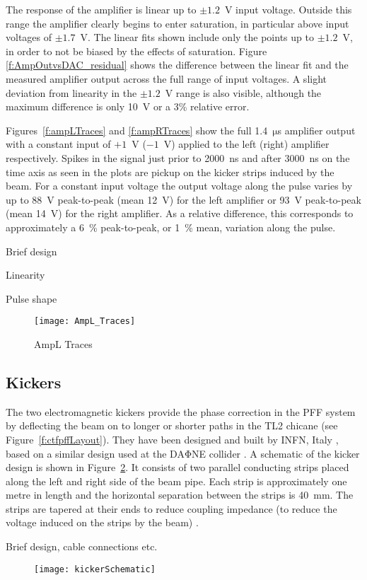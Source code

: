 The response of the amplifier is linear up to \(\pm1.2\)~V input voltage. 
Outside this range the amplifier clearly begins to enter saturation, in 
particular above input voltages of \(\pm1.7\)~V. The linear fits shown include 
only the points up to \(\pm1.2\)~V, in order to not be biased by the effects of 
saturation. Figure \ref{f:AmpOutvsDAC_residual} shows the difference between 
the linear fit and the measured amplifier output across the full range of input 
voltages. A slight deviation from linearity in the \(\pm1.2\)~V range is also 
visible, although the maximum difference is only 10~V or a 3\% relative error.

Figures~\ref{f:ampLTraces} and \ref{f:ampRTraces} show the full 
1.4~\(\mathrm{\mu}\)s amplifier output with a constant input of \(+1\)~V 
(\(-1\)~V) applied to the left (right) amplifier respectively. Spikes in the 
signal just prior to 2000~ns and after 3000~ns on the time axis as seen in the 
plots are pickup on the kicker strips induced by the beam. For a constant input 
voltage the output voltage along the pulse varies by up to 88~V peak-to-peak 
(mean 12~V) for the left amplifier or 93~V peak-to-peak (mean 14~V) for the 
right amplifier. As a relative difference, this corresponds to approximately a 
6~\% peak-to-peak, or 1~\% mean, variation along the pulse.

Brief design

Linearity

Pulse shape

\begin{figure}
 \centering
  \texttt{[image: AmpL\_Traces]}%
  \caption{\label{f:AmpL_Traces} AmpL Traces
  }
\end{figure}

\subsection{\label{ss:kick}Kickers}

The two electromagnetic kickers provide the phase correction in the PFF system 
by deflecting the beam on to longer or shorter paths in the TL2 chicane (see 
Figure~\ref{f:ctfpffLayout}). They have been designed and built by INFN, Italy 
\cite{infn}, based on a similar design used at the DA\(\mathrm{\Phi}\)NE 
collider \cite{dafneKick}. A schematic of the kicker design is shown in 
Figure~\ref{f:kickerSchematic}. It consists of two parallel conducting strips 
placed along the left and right side of the beam pipe. Each strip is 
approximately one metre in length and the horizontal separation between the 
strips is 40~mm. The strips are tapered at their ends to reduce coupling 
impedance (to reduce the voltage induced on the strips by the beam) 
\cite{kickerIPAC11}.

Brief design, cable connections etc.

\begin{figure}
  \texttt{[image: kickerSchematic]}%
  \caption{\label{f:kickerSchematic}
  }
\end{figure}

